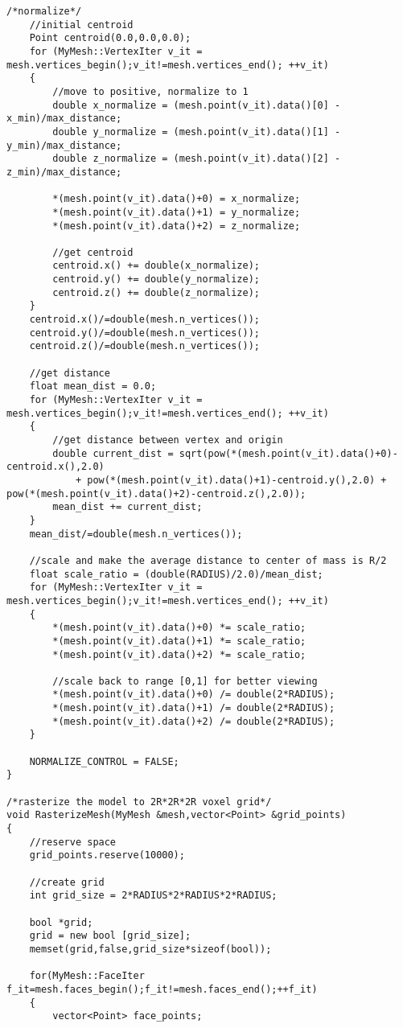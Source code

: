 \begin{enumerate}[1.]
\begin{lstlisting}[xleftmargin=0em]
	/*normalize*/
	//initial centroid
	Point centroid(0.0,0.0,0.0);
	for (MyMesh::VertexIter v_it = mesh.vertices_begin();v_it!=mesh.vertices_end(); ++v_it)
	{
		//move to positive, normalize to 1 
		double x_normalize = (mesh.point(v_it).data()[0] - x_min)/max_distance;
		double y_normalize = (mesh.point(v_it).data()[1] - y_min)/max_distance;
		double z_normalize = (mesh.point(v_it).data()[2] - z_min)/max_distance;

		*(mesh.point(v_it).data()+0) = x_normalize;
		*(mesh.point(v_it).data()+1) = y_normalize;
		*(mesh.point(v_it).data()+2) = z_normalize;

		//get centroid
		centroid.x() += double(x_normalize);
		centroid.y() += double(y_normalize);
		centroid.z() += double(z_normalize);
	}
	centroid.x()/=double(mesh.n_vertices());
	centroid.y()/=double(mesh.n_vertices());
	centroid.z()/=double(mesh.n_vertices());

	//get distance
	float mean_dist = 0.0;
	for (MyMesh::VertexIter v_it = mesh.vertices_begin();v_it!=mesh.vertices_end(); ++v_it)
	{
		//get distance between vertex and origin
		double current_dist = sqrt(pow(*(mesh.point(v_it).data()+0)-centroid.x(),2.0) 
			+ pow(*(mesh.point(v_it).data()+1)-centroid.y(),2.0) + pow(*(mesh.point(v_it).data()+2)-centroid.z(),2.0));
		mean_dist += current_dist;
	}
	mean_dist/=double(mesh.n_vertices());

	//scale and make the average distance to center of mass is R/2
	float scale_ratio = (double(RADIUS)/2.0)/mean_dist;
	for (MyMesh::VertexIter v_it = mesh.vertices_begin();v_it!=mesh.vertices_end(); ++v_it)
	{
		*(mesh.point(v_it).data()+0) *= scale_ratio;
		*(mesh.point(v_it).data()+1) *= scale_ratio;
		*(mesh.point(v_it).data()+2) *= scale_ratio;

		//scale back to range [0,1] for better viewing 
		*(mesh.point(v_it).data()+0) /= double(2*RADIUS);
		*(mesh.point(v_it).data()+1) /= double(2*RADIUS);
		*(mesh.point(v_it).data()+2) /= double(2*RADIUS);
	}

	NORMALIZE_CONTROL = FALSE;
}

/*rasterize the model to 2R*2R*2R voxel grid*/
void RasterizeMesh(MyMesh &mesh,vector<Point> &grid_points)
{
	//reserve space 
	grid_points.reserve(10000);

	//create grid 
	int grid_size = 2*RADIUS*2*RADIUS*2*RADIUS;

	bool *grid;
	grid = new bool [grid_size];
	memset(grid,false,grid_size*sizeof(bool));

	for(MyMesh::FaceIter f_it=mesh.faces_begin();f_it!=mesh.faces_end();++f_it)
	{
		vector<Point> face_points;


\end{lstlisting}
\end{enumerate}
